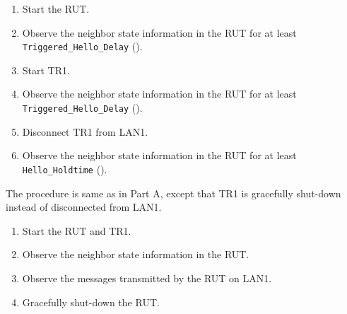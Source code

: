 \documentclass[11pt]{report}
\begin{document}


\begin{enumerate}

  \item Start the RUT.

  \item Observe the neighbor state information in the RUT for at least
        \verb=Triggered_Hello_Delay= ({\PimsmTriggeredHelloDelay}).

  \item Start TR1.

  \item Observe the neighbor state information in the RUT for at least
        \verb=Triggered_Hello_Delay= ({\PimsmTriggeredHelloDelay}).

  \item Disconnect TR1 from LAN1.

  \item Observe the neighbor state information in the RUT for at least
        \verb=Hello_Holdtime= ({\PimsmHelloHoldtime}).

\end{enumerate}


The procedure is same as in Part A, except that TR1 is gracefully shut-down
instead of disconnected from LAN1.


\begin{enumerate}

  \item Start the RUT and TR1.

  \item Observe the neighbor state information in the RUT.

  \item Observe the messages transmitted by the RUT on LAN1.

  \item Gracefully shut-down the RUT.

\end{enumerate}


\end{document}
